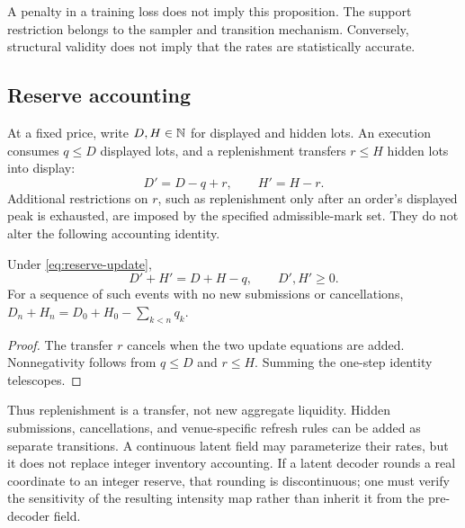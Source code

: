 A penalty in a training loss does not imply this proposition. The support restriction belongs to the sampler and transition mechanism. Conversely, structural validity does not imply that the rates are statistically accurate.

\subsection{Reserve accounting}
At a fixed price, write $D,H\in\mathbb N$ for displayed and hidden lots. An execution consumes $q\le D$ displayed lots, and a replenishment transfers $r\le H$ hidden lots into display:
\begin{equation}\label{eq:reserve-update}
 D'=D-q+r,\qquad H'=H-r.
\end{equation}
Additional restrictions on $r$, such as replenishment only after an order's displayed peak is exhausted, are imposed by the specified admissible-mark set. They do not alter the following accounting identity.

\begin{proposition}\label{prop:reserve}
Under \eqref{eq:reserve-update},
\begin{equation}\label{eq:reserve-conservation}
 D'+H'=D+H-q,\qquad D',H'\ge0.
\end{equation}
For a sequence of such events with no new submissions or cancellations,
$D_n+H_n=D_0+H_0-\sum_{k<n}q_k$.
\end{proposition}
\begin{proof}
The transfer $r$ cancels when the two update equations are added. Nonnegativity follows from $q\le D$ and $r\le H$. Summing the one-step identity telescopes.
\end{proof}

Thus replenishment is a transfer, not new aggregate liquidity. Hidden submissions, cancellations, and venue-specific refresh rules can be added as separate transitions. A continuous latent field may parameterize their rates, but it does not replace integer inventory accounting. If a latent decoder rounds a real coordinate to an integer reserve, that rounding is discontinuous; one must verify the sensitivity of the resulting intensity map rather than inherit it from the pre-decoder field.

